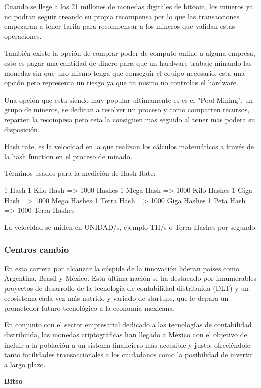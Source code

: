 \documentclass[12pt,letterpaper]{article}
\begin{document}
Cuando se llege a los 21 millones de monedas digitales de bitcoin, los mineros ya no podran seguir creando su propia recompensa por lo que las transacciones empezaran a tener tarifa para recompensar a los mineros que validan estas operaciones.

	Tambi\'en existe la opci\'on de comprar poder de computo online a alguna empresa, esto es pagar una cantidad de dinero para que un hardware trabaje minando las monedas sin que uno mismo tenga que conseguir el equipo necesario, esta una opci\'on pero representa un riesgo ya que tu mismo no controlas el hardware.
	
	Una opci\'on que esta siendo muy popular ultimamente es es el "Pool Mining", un grupo de mineros, se dedican a resolver un proceso y como comparten recursos, reparten la recompesa pero esta la consiguen mas seguido al tener mas podera su disposici\'on.

Hash rate, es la velocidad en la que realizan los cálculos matemáticos a través de la hash function en el proceso de minado.

Términos usados para la medición de Hash Rate:

    1 Hash
    1 Kilo Hash => 1000 Hashes
    1 Mega Hash => 1000 Kilo Hashes
    1 Giga Hash => 1000 Mega Hashes
    1 Terra Hash => 1000 Giga Hashes
    1 Peta Hash => 1000 Terra Hashes

La velocidad se miden en UNIDAD/s, ejemplo TH/s o Terra-Hashes por segundo.	

		\subsubsection*{Centros cambio}

En esta carrera por alcanzar la c\'uspide de la innovaci\'on lideran pa\'ises como Argentina, Brasil y M\'exico. Esta \'ultima naci\'on se ha destacado por innumerables proyectos de desarrollo de la tecnolog\'ia de contabilidad distribuida (DLT) y un ecosistema cada vez m\'as nutrido y variado de startups, que le depara un prometedor futuro tecnol\'ogico a la econom\'ia mexicana.		

En conjunto con el sector empresarial dedicado a las tecnolog\'ias de contabilidad distribuida, las monedas criptogr\'aficas han llegado a M\'exico con el objetivo de incluir a la poblaci\'on a un sistema financiero m\'as accesible y justo; ofreci\'endole tanto facilidades transaccionales a los ciudadanos como la posibilidad de invertir a largo plazo.

\textbf{Bitso}
\end{document}
